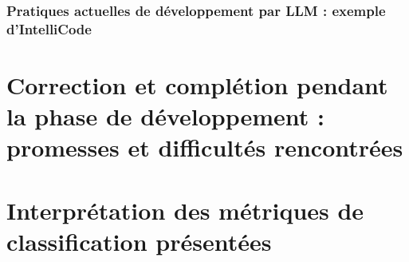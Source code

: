             \subsubsection{Pratiques actuelles de développement par LLM : exemple d'IntelliCode}
    \section{Correction et complétion pendant la phase de développement : promesses et difficultés rencontrées}
    \section{Interprétation des métriques de classification présentées}
